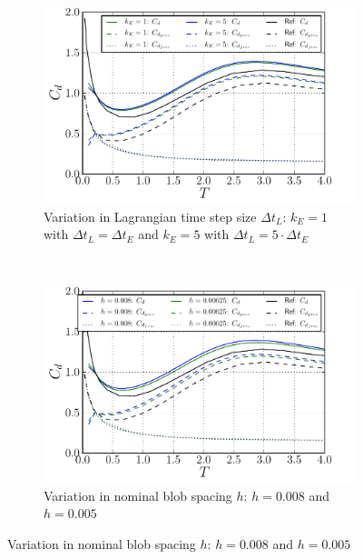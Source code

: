 	\begin{figure}[!p]
     \centering
     \begin{subfigure}[t]{0.49\textwidth}
             \includegraphics[width=\textwidth]{./figures/validation/isc/hybrid_ISC_drag_kComparison.pdf}
             \caption{Variation in Lagrangian time step size $\Delta t_L$: $k_E=1$ with $\Delta t_L = \Delta t_E$ and $k_E=5$ with $\Delta t_L = 5\cdot{\Delta t_E}$}
             \label{fig:hybrid_ISC_drag_kComparison}
     \end{subfigure}%
     ~ %
     \begin{subfigure}[t]{0.49\textwidth}
             \includegraphics[width=\textwidth]{./figures/validation/isc/hybrid_ISC_drag_nBlobComparison.pdf}
             \caption{Variation in nominal blob spacing $h$: $h=0.008$ and $h=0.005$}
             \label{fig:hybrid_ISC_drag_nBlobComparison}
     \end{subfigure}
     

\end{figure}
